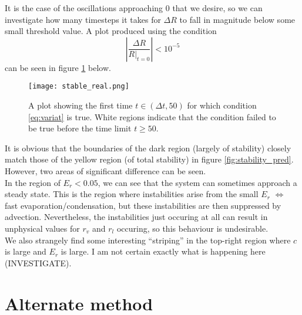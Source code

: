 \documentclass[11pt]{article}
\begin{document}
It is the case of the oscillations approaching $0$ that we desire, so we can investigate how many timesteps it takes for $\Delta R$ to fall in magnitude below some small threshold value. A plot produced using the condition
\begin{equation}
\left|\frac{\Delta R}{R|_{t=0}}\right|<10^{-5}		\label{eq:variat}
\end{equation}
can be seen in figure \ref{fig:stable_real} below.
\begin{figure}[H]
\centering
\texttt{[image: stable\_real.png]}
\caption{A plot showing the first time $t\in(\Delta t,50)$ for which condition \ref{eq:variat} is true. White regions indicate that the condition failed to be true before the time limit $t\geq 50$.}
\label{fig:stable_real}
\end{figure}
It is obvious that the boundaries of the dark region (largely of stability) closely match those of the yellow region (of total stability) in figure \ref{fig:stability_pred}. However, two areas of significant difference can be seen. \\
In the region of $E_r<0.05$, we can see that the system can sometimes approach a steady state. This is the region where instabilities arise from the small $E_r$ $\Leftrightarrow$ fast evaporation/condensation, but these instabilities are then suppressed by advection. Nevertheless, the instabilities just occuring at all can result in unphysical values for $r_v$ and $r_l$ occuring, so this behaviour is undesirable. \\
We also strangely find some interesting ``striping'' in the top-right region where $c$ is large and $E_r$ is large. I am not certain exactly what is happening here (INVESTIGATE). 

\section{Alternate method}

\newpage


\end{document}

